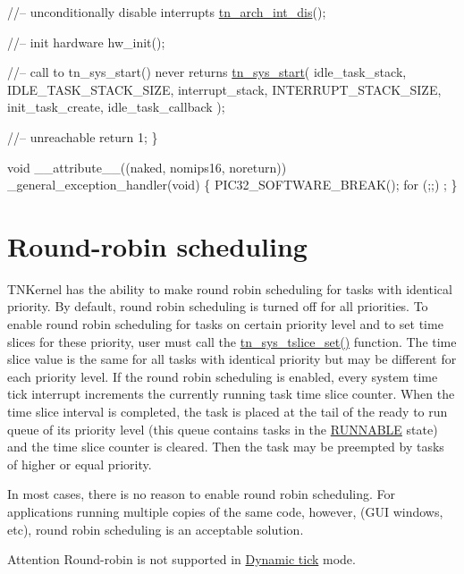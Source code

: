 \begin{DoxyCodeInclude}
   \textcolor{comment}{//-- unconditionally disable interrupts}
   \hyperlink{tn__arch_8h_a2b3f2294ac42a599662c573394b14c75}{tn\_arch\_int\_dis}();

   \textcolor{comment}{//-- init hardware}
   hw\_init();

   \textcolor{comment}{//-- call to tn\_sys\_start() never returns}
   \hyperlink{tn__sys_8h_a62ab25d9d8ca01c02d368968f19e49bf}{tn\_sys\_start}(
         idle\_task\_stack,
         IDLE\_TASK\_STACK\_SIZE,
         interrupt\_stack,
         INTERRUPT\_STACK\_SIZE,
         init\_task\_create,
         idle\_task\_callback
         );

   \textcolor{comment}{//-- unreachable}
   \textcolor{keywordflow}{return} 1;
\}

\textcolor{keywordtype}{void} \_\_attribute\_\_((naked, nomips16, noreturn)) \_general\_exception\_handler(\textcolor{keywordtype}{void})
\{
   PIC32\_SOFTWARE\_BREAK();
   \textcolor{keywordflow}{for} (;;) ;
\}

\end{DoxyCodeInclude}
\hypertarget{quick_guide_round_robin}{}\section{Round-\/robin scheduling}\label{quick_guide_round_robin}
T\+N\+Kernel has the ability to make round robin scheduling for tasks with identical priority. By default, round robin scheduling is turned off for all priorities. To enable round robin scheduling for tasks on certain priority level and to set time slices for these priority, user must call the {\ttfamily \hyperlink{tn__sys_8h_a05fc370b6faa604fd8ff9411361c4cd0}{tn\+\_\+sys\+\_\+tslice\+\_\+set()}} function. The time slice value is the same for all tasks with identical priority but may be different for each priority level. If the round robin scheduling is enabled, every system time tick interrupt increments the currently running task time slice counter. When the time slice interval is completed, the task is placed at the tail of the ready to run queue of its priority level (this queue contains tasks in the \hyperlink{tn__tasks_8h_a5e12e8a0ab280b515f44bf3fee1210a6a02783ac7808aeda318a6f506b7a276dc}{{\ttfamily R\+U\+N\+N\+A\+B\+L\+E}} state) and the time slice counter is cleared. Then the task may be preempted by tasks of higher or equal priority.

In most cases, there is no reason to enable round robin scheduling. For applications running multiple copies of the same code, however, (G\+U\+I windows, etc), round robin scheduling is an acceptable solution.

\begin{DoxyAttention}{Attention}
Round-\/robin is not supported in \hyperlink{time_ticks_time_ticks__dynamic_tick}{Dynamic tick} mode. 
\end{DoxyAttention}
